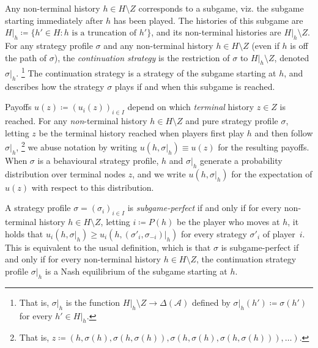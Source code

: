 Any non-terminal history $h \in H \setminus Z$ corresponds to a subgame, viz. the subgame starting immediately after $h$ has been played. The histories of this subgame are $H|_h \coloneqq \{ h' \in H : \text{$h$ is a truncation of $h'$} \}$, and its non-terminal histories are $H|_h \setminus Z$. For any strategy profile $\sigma$ and any non-terminal history $h \in H \setminus Z$ (even if $h$ is off the path of $\sigma$), the \emph{continuation strategy} is the restriction of $\sigma$ to $H|_h \setminus Z$, denoted $\sigma|_h$.%
	\footnote{That is, $\sigma|_h$ is the function $H|_h \setminus Z \to \Delta(\mathcal{A})$ defined by $\sigma|_h(h') \coloneqq \sigma(h')$ for every $h' \in H|_h$.}
The continuation strategy is a strategy of the subgame starting at $h$, and describes how the strategy $\sigma$ plays if and when this subgame is reached.

Payoffs $u(z) \coloneqq (u_i(z))_{i \in I}$ depend on which \emph{terminal} history $z \in Z$ is reached. For any \emph{non}-terminal history $h \in H \setminus Z$ and pure strategy profile $\sigma$, letting $z$ be the terminal history reached when players first play $h$ and then follow $\sigma|_h$,%
	\footnote{That is, $z \coloneqq ( h, \sigma(h), \sigma( h, \sigma(h) ), \sigma( h, \sigma(h), \sigma( h, \sigma(h) ) ), \dots )$.}
we abuse notation by writing $u(h,\sigma|_h) \equiv u(z)$ for the resulting payoffs. When $\sigma$ is a behavioural strategy profile, $h$ and $\sigma|_h$ generate a probability distribution over terminal nodes $z$, and we write $u(h,\sigma|_h)$ for the expectation of $u(z)$ with respect to this distribution.

A strategy profile $\sigma = (\sigma_i)_{i \in I}$ is \emph{subgame-perfect} if and only if for every non-terminal history $h \in H \setminus Z$, letting $i \coloneqq P(h)$ be the player who moves at $h$, it holds that $u_i(h,\sigma|_h) \geq u_i(h,(\sigma'_i,\sigma_{-i})|_h)$ for every strategy $\sigma'_i$ of player~$i$. This is equivalent to the usual definition, which is that $\sigma$ is subgame-perfect if and only if for every non-terminal history $h \in H \setminus Z$, the continuation strategy profile $\sigma|_h$ is a Nash equilibrium of the subgame starting at $h$.

